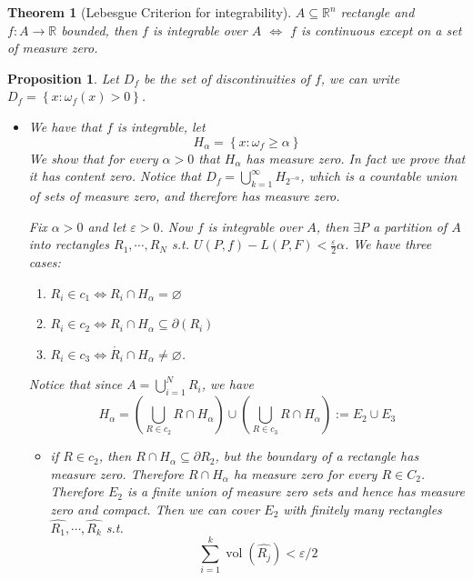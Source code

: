 \documentclass[11pt,a4paper]{article}
\theoremstyle{definition}
\theoremstyle{plain}
\newtheorem{theorem}[definition]{Theorem}
\newtheorem{proposition}[definition]{Proposition}
\theoremstyle{remark}
\newcommand{\R}{\mathbb{R}}
\renewcommand{\set}[1]{\left\{ #1 \right\}}
\newcommand{\vol}{\operatorname{vol}}
\begin{document}
\begin{theorem}[Lebesgue Criterion for integrability]
    $A \subseteq \R^n$ rectangle and $f \colon A \to \R$ bounded, then $f$ is integrable over $A$ 
    $\iff$ $f$ is continuous except on a set of measure zero. 
\end{theorem}

\begin{proposition}
    Let $D_f$ be the set of discontinuities of $f$, we can write $D_f = \set{x \colon \omega_f (x) > 0}$. 
    \begin{itemize}
        \item[$\implies$] We have that $f$ is integrable, let 
        $$H_\alpha = \set{x \colon \omega_f \ge \alpha}$$ 
        We show that for every $\alpha > 0$ that $H_\alpha$ has measure zero. In fact we prove that it has content zero. 
        Notice that $D_f = \bigcup_{k=1}^\infty H_{2^{-\alpha}}$, which is a countable union of sets of measure zero, and therefore 
        has measure zero. 

        Fix $\alpha > 0$ and let $\varepsilon > 0$. Now $f$ is integrable over $A$, then $\exists P$ a partition of $A$ into rectangles $R_1, \cdots, R_N$
        s.t. $U(P,f) - L(P,F) < \frac{\varepsilon}{2} \alpha$. We have three cases: 
        \begin{enumerate}[label = \roman*)]
            \item $R_i \in c_1 \iff R_i \cap H_\alpha = \varnothing$
            \item $R_i \in c_2 \iff R_i \cap H_\alpha \subseteq \partial (R_i)$
            \item $R_i \in c_3 \iff \mathring{R_i} \cap H_\alpha \ne \varnothing$. 
        \end{enumerate}
        Notice that since $A = \bigcup_{i=1}^N R_i$, we have  
        $$H_\alpha = \left(\bigcup_{R \in c_2} R \cap H_\alpha\right) \cup \left(\bigcup_{R \in c_3} R \cap H_\alpha\right) := E_2 \cup E_3$$
        \begin{itemize}
            \item if $R \in c_2$, then $R \cap H_\alpha \subseteq \partial R_2$, but the boundary of a rectangle has measure zero. Therefore 
            $R \cap H_\alpha$ ha measure zero for every $R \in C_2$. 
            Therefore $E_2$ is a finite union of measure zero sets and hence has measure zero and compact. Then we can 
            cover $E_2$ with finitely many rectangles $\hat{R_1}, \cdots, \hat{R_k}$ s.t. 
            $$\sum_{i=1}^k \vol(\hat{R_j}) < \varepsilon/2$$


\end{itemize}
\end{itemize}
\end{proposition}
\end{document}
